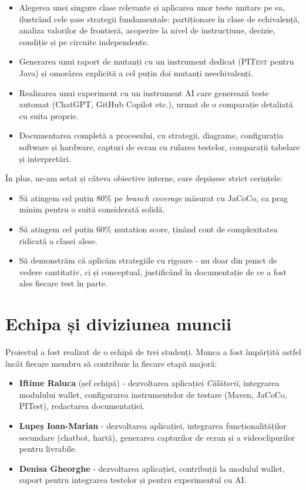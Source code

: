\begin{itemize}
    \item Alegerea unei singure clase relevante și aplicarea unor teste unitare pe ea, ilustrând cele șase strategii fundamentale: partiționare în clase de echivalență, analiza valorilor de frontieră, acoperire la nivel de instrucțiune, decizie, condiție și pe circuite independente.
    \item Generarea unui raport de mutanți cu un instrument dedicat (\textsc{PITest} pentru Java) și omorârea explicită a cel puțin doi mutanți neechivalenți.
    \item Realizarea unui experiment cu un instrument AI care generează teste automat (ChatGPT, GitHub Copilot etc.), urmat de o comparație detaliată cu suita proprie.
    \item Documentarea completă a procesului, cu strategii, diagrame, configurația software și hardware, capturi de ecran cu rularea testelor, comparații tabelare și interpretări.
\end{itemize}

În plus, ne-am setat și câteva obiective interne, care depășesc strict cerințele:

\begin{itemize}
    \item Să atingem cel puțin 80\% pe \textit{branch coverage} măsurat cu JaCoCo, ca prag minim pentru o suită considerată solidă.
    \item Să atingem cel puțin 60\% mutation score, ținând cont de complexitatea ridicată a clasei alese.
    \item Să demonstrăm că aplicăm strategiile cu rigoare - nu doar din punct de vedere cantitativ, ci și conceptual, justificând în documentație de ce a fost ales fiecare test în parte.
\end{itemize}

\section{Echipa și diviziunea muncii}

Proiectul a fost realizat de o echipă de trei studenți. Munca a fost împărțită astfel încât fiecare membru să contribuie la fiecare etapă majoră:

\begin{itemize}
    \item \textbf{Iftime Raluca} (șef echipă) - dezvoltarea aplicației \textit{Călătorii}, integrarea modulului wallet, configurarea instrumentelor de testare (Maven, JaCoCo, PITest), redactarea documentației.
    \item \textbf{Lupeș Ioan-Marian} - dezvoltarea aplicației, integrarea funcționalităților secundare (chatbot, hartă), generarea capturilor de ecran și a videoclipurilor pentru livrabile.
    \item \textbf{Denisa Gheorghe} - dezvoltarea aplicației, contribuții la modulul wallet, suport pentru integrarea testelor și pentru experimentul cu AI.
\end{itemize}

